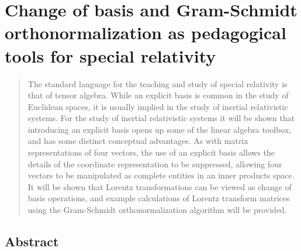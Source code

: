 
%

\label{chap:grahamSchmidtLorentz}


\chapter{Change of basis and Gram-Schmidt orthonormalization as pedagogical tools for special relativity}
\beginArtNoToc

\author{Peeter Joot }

\begin{abstract}

The standard language for the teaching and study of special relativity is that of tensor algebra.
While an explicit basis is common in the study of Euclidean spaces, it is usually implied in the study of inertial relativistic systems.
For the study of inertial relativistic systems it will be shown that introducing an explicit basis opens up some of the linear algebra toolbox, and has some distinct conceptual advantages.
As with matrix representations of four vectors, the use of an explicit basis allows the details of the coordinate representation to be suppressed, allowing four vectors to be manipulated as complete entities in an inner products space.
It will be shown that Lorentz transformations can be viewed as change of basis operations, and example calculations of Lorentz transform matrices using the Gram-Schmidt orthonormalization algorithm will be provided.

\end{abstract}


\section{Abstract}


